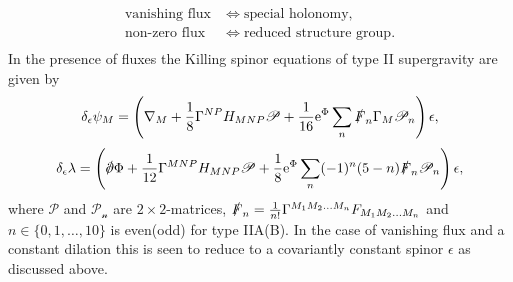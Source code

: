 \begin{align*}
    \text{vanishing flux}&\Longleftrightarrow \text{special holonomy},\\
    \text{non-zero flux}&\Longleftrightarrow \text{reduced structure group}.\\
\end{align*}
In the presence of fluxes the Killing spinor equations of type II supergravity are given by \cite{Blumenhagen2013}
\begin{equation}
    \delta_\epsilon \psi_M = \left(\nabla_M+\frac{1}{8}\Gamma^{NP}H_{MNP}\mathscr{P}+\frac{1}{16}\mathrm{e}^\Phi\sum_{n}\slashed{F}_n\Gamma_M\mathscr{P}_n\right)\epsilon,
\end{equation}
\begin{equation}
    \delta_\epsilon \lambda = \left(\slashed{\pd}\Phi+\frac{1}{12}\Gamma^{MNP}H_{MNP}\mathscr{P}+\frac{1}{8}\ee^\Phi\sum_{n}(-1)^n(5-n)\slashed{F}_n\mathscr{P}_n\right)\epsilon,
\end{equation}
where $\mathscr{P}$ and $\mathscr{P_n}$ are $2\times 2$-matrices, $\slashed{F}_n=\frac{1}{n!}\Gamma^{M_1M_2\ldots M_n}F_{M_1M_2\ldots M_n}$ and $n\in\{0,1,\ldots,10\}$ is even(odd) for type IIA(B). In the case of vanishing flux and a constant dilation this is seen to reduce to a covariantly constant spinor $\epsilon$ as discussed above. 

